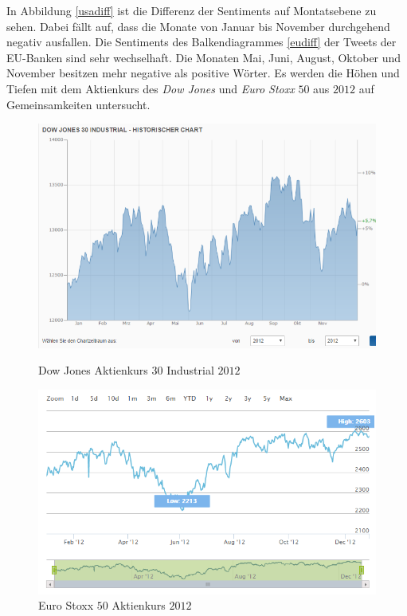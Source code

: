 In Abbildung \ref{usadiff} ist die Differenz der Sentiments auf Montatsebene zu sehen. Dabei fällt auf, dass die Monate von Januar bis November durchgehend negativ ausfallen. Die Sentiments des Balkendiagrammes \ref{eudiff} der Tweets der EU-Banken sind sehr wechselhaft. Die Monaten Mai, Juni, August, Oktober und November besitzen mehr negative als positive Wörter. Es werden die Höhen und Tiefen mit dem Aktienkurs des \textit{Dow Jones} und \textit{Euro Stoxx} $50$ aus $2012$ auf Gemeinsamkeiten untersucht. 
 \begin{figure}[H]
 \begin{minipage}[b]{.4\linewidth} %
 	\includegraphics[width=1\textwidth]{Pictures/DowJones2012.png}
 	\caption{Dow Jones Aktienkurs 30 Industrial $2012$ \cite{Dow}}\label{dowjones}
 \end{minipage}
 \hspace{.2\linewidth}%
 \begin{minipage}[b]{.4\linewidth} %
 	\includegraphics[width=1\textwidth]{Pictures/EuroxStoxx.png}
 	\caption{Euro Stoxx $50$ Aktienkurs $2012$ \cite{eurostoxx}} \label{stoxx}
 \end{minipage}

\end{figure}
